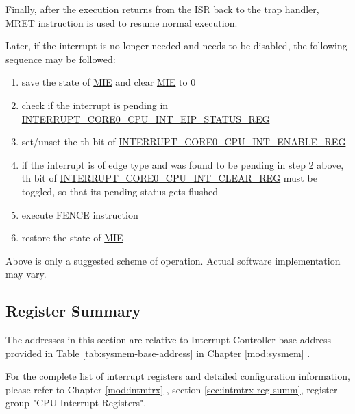 \documentclass[main\_\_EN.tex]{subfiles}
\begin{document}
Finally, after the execution returns from the ISR back to the trap handler, MRET instruction is used to resume normal execution.

Later, if the  interrupt is no longer needed and needs to be disabled, the following sequence may be followed:
\begin{enumerate}
    \item save the state of \hyperref[fielddesc:MSTATUSMIE]{MIE} and clear \hyperref[fielddesc:MSTATUSMIE]{MIE} to 0
    \item check if the interrupt is pending in \hyperref[regdesc:INTERRUPTCORE0CPUINTEIPSTATUSREG]{INTERRUPT\_CORE0\_CPU\_INT\_EIP\_STATUS\_REG}
    \item set/unset the th bit of \hyperref[regdesc:INTERRUPTCORE0CPUINTENABLEREG]{INTERRUPT\_CORE0\_CPU\_INT\_ENABLE\_REG}
    \item if the interrupt is of edge type and was found to be pending in step 2 above, th bit of \hyperref[regdesc:INTERRUPTCORE0CPUINTCLEARREG]{INTERRUPT\_CORE0\_CPU\_INT\_CLEAR\_REG} must be toggled, so that its pending status gets flushed
    \item execute FENCE instruction
    \item restore the state of \hyperref[fielddesc:MSTATUSMIE]{MIE}
\end{enumerate}

Above is only a suggested scheme of operation. Actual software implementation may vary.


\hypertarget{riscvcpu-int-reg-summ}{}
\subsection{Register Summary}
\label{sec:riscvcpu-int-reg-summ}


The addresses in this section are relative to Interrupt Controller base address provided in Table \ref{tab:sysmem-base-address} in Chapter \ref{mod:sysmem} \textit{}.

For the complete list of interrupt registers and detailed configuration information, please refer to Chapter \ref{mod:intmtrx} \textit{}, section \ref{sec:intmtrx-reg-summ}, register group "CPU Interrupt Registers".



\end{document}

